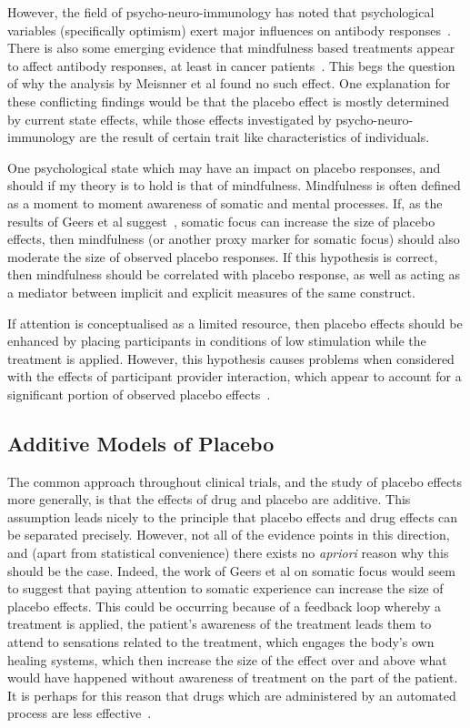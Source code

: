 However, the field of psycho-neuro-immunology has noted that psychological variables (specifically optimism) exert major influences on antibody responses~\cite{Carver2010}. There is also some emerging evidence that mindfulness based treatments appear to affect antibody responses, at least in cancer patients~\cite{Ledesma2009}. This begs the question of why the analysis by Meisnner et al found no such effect. One explanation for these conflicting findings would be that the placebo effect is mostly determined by current state effects, while those effects investigated by psycho-neuro-immunology are the result of certain trait like characteristics of individuals.  

One psychological state which may have an impact on placebo responses, and should if my theory is to hold is that of mindfulness. Mindfulness is often defined as a moment to moment awareness of somatic and mental processes. If, as the results of Geers et al suggest~\cite{Geers2006}, somatic focus can increase the size of placebo effects, then mindfulness (or another proxy marker for somatic focus) should also moderate the size of observed placebo responses. If this hypothesis is correct, then mindfulness should be correlated with placebo response, as well as acting as a mediator between implicit and explicit measures of the same construct. 

If attention is conceptualised as a limited resource, then placebo effects should be enhanced by placing participants in conditions of low stimulation while the treatment is applied. However, this hypothesis causes problems when  considered with the effects of participant provider interaction, which appear to account for a significant portion of observed placebo effects~\cite{DiBlasi2001,Kaptchuk2008}. 

\subsection{Additive Models of Placebo}

The common approach throughout clinical trials, and the study of placebo effects more generally, is that the effects of drug and placebo are additive. This assumption leads nicely to the principle that placebo effects and drug effects can be separated precisely. However, not all of the evidence points in this direction, and (apart from statistical convenience) there exists no 
{\it apriori\/} reason why this should be the case. Indeed, the work of Geers et al on somatic focus would seem to suggest that paying attention to somatic experience can increase the size of placebo effects. This could be occurring because of a feedback loop whereby a treatment is applied, the patient's awareness of the treatment leads them to attend to sensations related to the treatment, which engages the body's own healing systems, which then increase the size of the effect over and above what would have happened without awareness of treatment on the part of the patient. It is perhaps for this reason that drugs which are administered by an automated process are less effective~\cite{benedetti2003}. 

